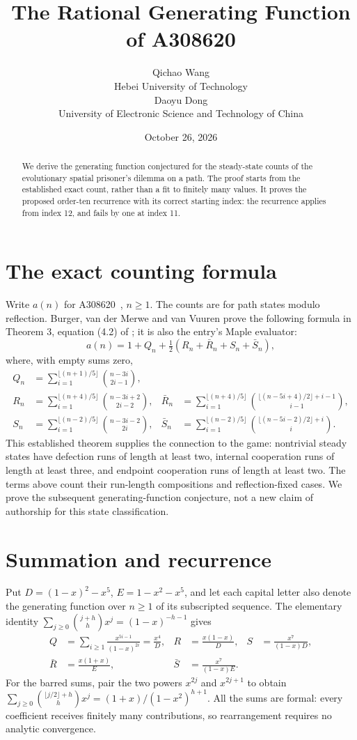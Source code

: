 \documentclass[10pt]{article}
\title{The Rational Generating Function of A308620}
\author{Qichao Wang\\{\small Hebei University of Technology}\\[.3em]Daoyu Dong\\{\small University of Electronic Science and Technology of China}}
\date{October 26, 2026}
\begin{document}
\maketitle
\begin{abstract}
We derive the generating function conjectured for the steady-state
counts of the evolutionary spatial prisoner's dilemma on a path.
The proof starts from the established exact count, rather than a
fit to finitely many values. It proves the proposed order-ten
recurrence with its correct starting index: the recurrence applies
from index 12, and fails by one at index 11.
\end{abstract}
\section{The exact counting formula}
Write $a(n)$ for A308620~\cite{oeis}, $n\ge1$. The counts are for
path states modulo reflection. Burger, van der Merwe and van Vuuren
prove the following formula in Theorem 3, equation (4.2) of
\cite{paper}; it is also the entry's Maple evaluator:
\[
 a(n)=1+Q_n+\tfrac12(R_n+\bar R_n+S_n+\bar S_n),
\]
where, with empty sums zero,
\begin{align*}
 Q_n&=\sum_{i=1}^{\lfloor(n+1)/5\rfloor}\binom{n-3i}{2i-1},\\
 R_n&=\sum_{i=1}^{\lfloor(n+4)/5\rfloor}\binom{n-3i+2}{2i-2},
 &\bar R_n&=\sum_{i=1}^{\lfloor(n+4)/5\rfloor}
 \binom{\lfloor(n-5i+4)/2\rfloor+i-1}{i-1},\\
 S_n&=\sum_{i=1}^{\lfloor(n-2)/5\rfloor}\binom{n-3i-2}{2i},
 &\bar S_n&=\sum_{i=1}^{\lfloor(n-2)/5\rfloor}
 \binom{\lfloor(n-5i-2)/2\rfloor+i}{i}.
\end{align*}
This established theorem supplies the connection to the game:
nontrivial steady states have defection runs of length at least
two, internal cooperation runs of length at least three, and
endpoint cooperation runs of length at least two. The terms above
count their run-length compositions and reflection-fixed cases.
We prove the subsequent generating-function conjecture, not a new
claim of authorship for this state classification.

\section{Summation and recurrence}
Put $D=(1-x)^2-x^5$, $E=1-x^2-x^5$, and let each capital letter
also denote the generating function over $n\ge1$ of its subscripted
sequence. The elementary identity
$\sum_{j\ge0}\binom{j+h}{h}x^j=(1-x)^{-h-1}$ gives
\begin{align*}
 Q&=\sum_{i\ge1}\frac{x^{5i-1}}{(1-x)^{2i}}=\frac{x^4}{D},
 &R&=\frac{x(1-x)}{D},&S&=\frac{x^7}{(1-x)D},\\
 \bar R&=\frac{x(1+x)}{E},
 &\bar S&=\frac{x^7}{(1-x)E}.
\end{align*}
For the barred sums, pair the two powers $x^{2j}$ and $x^{2j+1}$
to obtain
$\sum_{j\ge0}\binom{\lfloor j/2\rfloor+h}{h}x^j
=(1+x)/(1-x^2)^{h+1}$.
All the sums are formal: every coefficient receives finitely many
contributions, so rearrangement requires no analytic convergence.
\end{document}
